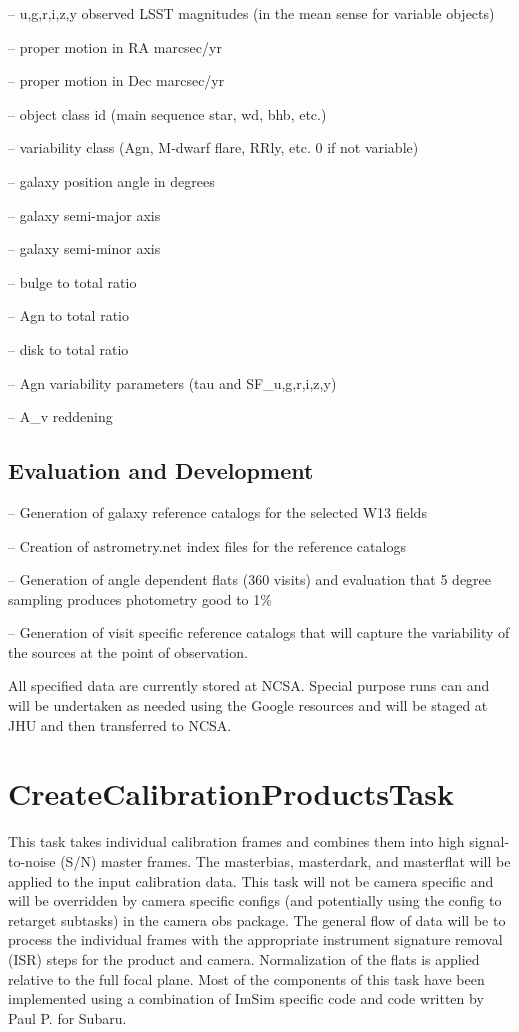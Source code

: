 \documentclass[prd, nofootinbib, floatfix, 11pt,tightenlines,times]{article}
\begin{document}
-- {u,g,r,i,z,y} observed LSST magnitudes (in the mean sense for variable objects)

-- proper motion in RA marcsec/yr

-- proper motion in Dec marcsec/yr

-- object class id (main sequence star, wd, bhb, etc.)

-- variability class (Agn, M-dwarf flare, RRly, etc.  0 if not variable)

-- galaxy position angle in degrees 

-- galaxy semi-major axis 

-- galaxy semi-minor axis

-- bulge to total ratio

-- Agn to total ratio

-- disk to total ratio

-- Agn variability parameters (tau and SF\_{u,g,r,i,z,y})

-- A\_v reddening 

\subsection{Evaluation and Development}

-- Generation of galaxy reference catalogs for the selected W13 fields

-- Creation of astrometry.net index files for the reference catalogs

-- Generation of angle dependent flats (360 visits) and evaluation
that 5 degree sampling produces photometry good to 1\%

-- Generation of visit specific reference catalogs that will capture
the  variability of the sources at the point of observation.

All specified data are currently stored at NCSA.  Special purpose runs
can and will be undertaken as needed using the Google resources and
will be staged at JHU and then transferred to NCSA.  


\section{CreateCalibrationProductsTask} 
This task takes individual calibration frames and combines them into
high signal-to-noise (S/N) master frames.  The masterbias, masterdark,
and masterflat will be applied to the input calibration data. This task will
not be camera specific and will be overridden by camera specific
configs (and potentially using the config to retarget subtasks) in the
camera obs package.  The general flow of data will be to process the
individual frames with the appropriate instrument signature removal
(ISR) steps for the product and camera.  Normalization of the flats is
applied relative to the full focal plane. Most of the components of
this task have been implemented using a combination of ImSim specific
code and code written by Paul P. for Subaru.
\end{document}
